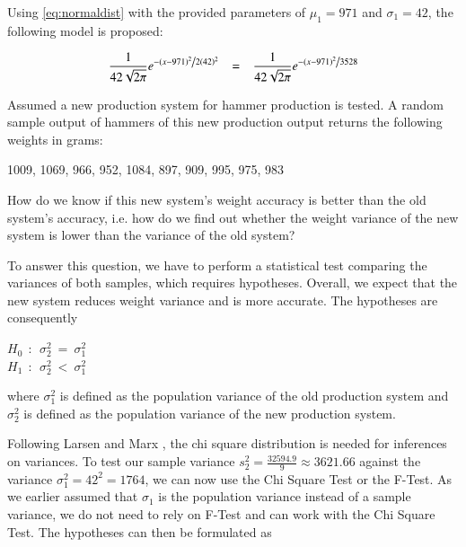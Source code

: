 Using \eqref{eq:normaldist} with the provided parameters of $\mu_1 = 971$ and $\sigma_1 = 42$, the following model is proposed: 

\begin{equation} \frac{1}{{42 \sqrt {2\pi } }}e^{{{ - \left( {x - 971 } \right)^2 } \mathord{\left/ {\vphantom {{ - \left( {x - 971 } \right)^2 } {2(42) ^2 }}} \right. \kern-\nulldelimiterspace}{2(42) ^2 }}} ~~~=~~~ \frac{1}{{42 \sqrt {2\pi } }}e^{{{ - \left( {x - 971 } \right)^2 } \mathord{\left/ {\vphantom {{ - \left( {x - 971 } \right)^2 } {7056 }}} \right. \kern-\nulldelimiterspace}{3528 }}}
\label{eq:normaldistadapted}
\end{equation}



Assumed a new production system for hammer production is tested. A random sample output of hammers of this new production output returns the following weights in grams: \\

\begin{center}
    1009, 1069, 966, 952, 1084, 897, 909, 995, 975, 983
\end{center}

How do we know if this new system's weight accuracy is better than the old system's accuracy, i.e. how do we find out whether the weight variance of the new system is lower than the variance of the old system?

To answer this question, we have to perform a statistical test comparing the variances of both samples, which requires hypotheses. Overall, we expect that the new system reduces weight variance and is more accurate. The hypotheses are consequently 

\begin{center}
$H_0~~:~~ \sigma^2_2~=~\sigma^2_1$\\ 
$H_1~~:~~ \sigma^2_2~<~\sigma^2_1$
\end{center}

where $\sigma^2_1$ is defined as the population variance of the old production system and $\sigma^2_2$ is defined as the population variance of the new production system.

Following Larsen and Marx \cite[Chapter 7.5]{larsen2005introduction}, the chi square distribution is needed for inferences on variances. To test our sample variance $s_2^2 = \frac{32594.9}{9} \approx 3621.66 $ against the variance $\sigma^2_1 = 42^2 = 1764$, we can now use the Chi Square Test or the F-Test. As we earlier assumed that $\sigma_1$ is the population variance instead of a sample variance, we do not need to rely on F-Test and can work with the Chi Square Test. The hypotheses can then be formulated as 

